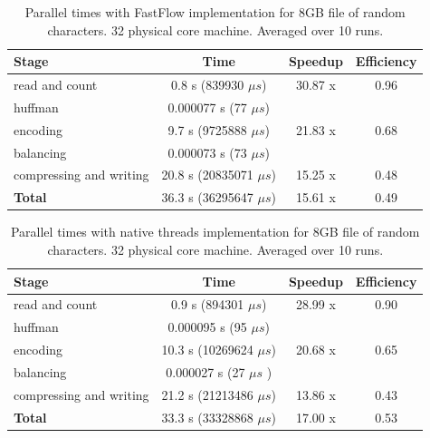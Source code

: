 \documentclass[12pt, letterpaper]{article}
\begin{document}
\begin{table}[h]
\begin{center}
\begin{tabular}{l c c c}
    \textbf{Stage} & \textbf{Time} & \textbf{Speedup} & \textbf{Efficiency} \\
    \hline
    read and count & 0.8 s (839930 $\mu s$) & 30.87 x & 0.96 \\
    \hline
    huffman & 0.000077 s (77 $\mu s$)  &  \\
    \hline
    encoding & 9.7 s (9725888 $\mu s$)  &  21.83 x & 0.68 \\
    \hline
    balancing & 0.000073 s (73 $\mu s$)  &\\
    \hline
    compressing and writing &  20.8 s (20835071 $\mu s$)  & 15.25 x & 0.48 \\
    \hline
    \textbf{Total} & 36.3 s (36295647 $\mu s$)   & 15.61 x & 0.49 \\ 
\end{tabular}
\caption{Parallel times with FastFlow implementation for 8GB file of random characters. 32 physical core machine. Averaged over 10 runs.}
\label{tab:ff_times}
\end{center}
\end{table}


\begin{table}[h]
\begin{center}
\begin{tabular}{l c c c}
    \textbf{Stage} & \textbf{Time} & \textbf{Speedup} & \textbf{Efficiency}  \\
    \hline
    read and count & 0.9 s (894301 $\mu s$)  & 28.99 x & 0.90  \\
    \hline
    huffman & 0.000095 s (95 $\mu s$) & \\
    \hline
    encoding & 10.3 s (10269624 $\mu s$)  & 20.68 x & 0.65 \\
    \hline
    balancing & 0.000027 s (27 $\mu s$ ) & \\
    \hline
    compressing and writing & 21.2 s (21213486 $\mu s$)  & 13.86 x & 0.43\\
    \hline
    \textbf{Total} & 33.3 s (33328868 $\mu s$)  & 17.00 x & 0.53 \\ 
\end{tabular}
\caption{Parallel times with native threads implementation for 8GB file of random characters. 32 physical core machine. Averaged over 10 runs.}    
\label{tab:thr_times}
\end{center}
\end{table}
\end{document}
